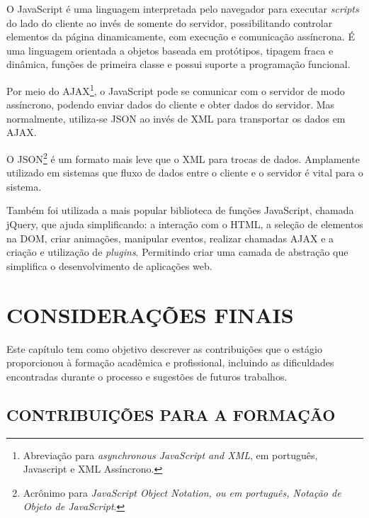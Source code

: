 \documentclass[
  12pt,				%
  openany,
  oneside,
  a4paper,			%
  english,			%
  brazil
]{article}
\numberwithin{figure}{section}
\numberwithin{table}{section}
\newcounter{subsubsubsection}[subsubsection]
\begin{document}



O JavaScript é uma linguagem interpretada pelo navegador para executar \textit{scripts} do lado do cliente ao invés de somente do servidor, possibilitando controlar elementos da página dinamicamente, com execução e comunicação assíncrona. É uma linguagem orientada a objetos baseada em protótipos, tipagem fraca e dinâmica, funções de primeira classe e possui suporte a programação funcional.

Por meio do AJAX\footnote{Abreviação para \textit{asynchronous JavaScript and XML}, em português, Javascript e XML Assíncrono.}, o JavaScript pode se comunicar com o servidor de modo assíncrono, podendo  enviar dados do cliente e obter dados do servidor. Mas normalmente, utiliza-se JSON ao invés de XML para transportar os dados em AJAX.

O JSON\footnote{Acrônimo para \textit{JavaScript Object Notation, ou em português, Notação de Objeto de JavaScript}.} é um formato mais leve que o XML para trocas de dados. Amplamente utilizado em sistemas que fluxo de dados entre o cliente e o servidor é vital para o sistema.

Também foi utilizada a mais popular biblioteca de funções JavaScript, chamada jQuery, que ajuda simplificando: a interação com o HTML, a seleção de elementos na DOM, criar animações, manipular eventos, realizar chamadas AJAX e a criação e utilização de \textit{plugins}. Permitindo criar uma camada de abstração que simplifica o desenvolvimento de aplicações web.




\clearpage
\section{CONSIDERAÇÕES FINAIS}


Este capítulo tem como objetivo descrever as contribuições que o estágio proporcionou à formação acadêmica e profissional, incluindo as dificuldades encontradas durante o processo e sugestões de futuros trabalhos.


\subsection{CONTRIBUIÇÕES PARA A FORMAÇÃO}
\end{document}
